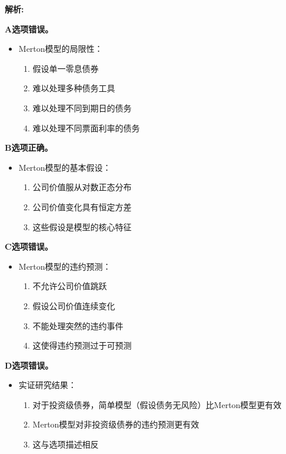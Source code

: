 \documentclass{article}
\newenvironment{explanation}
{\textbf{解析:}\par}
{\par}
\begin{document}
\begin{explanation}
    \textbf{A选项错误。}
    \begin{itemize}
        \item Merton模型的局限性：
        \begin{enumerate}
            \item 假设单一零息债券
            \item 难以处理多种债务工具
            \item 难以处理不同到期日的债务
            \item 难以处理不同票面利率的债务
        \end{enumerate}
    \end{itemize}
    
    \textbf{B选项正确。}
    \begin{itemize}
        \item Merton模型的基本假设：
        \begin{enumerate}
            \item 公司价值服从对数正态分布
            \item 公司价值变化具有恒定方差
            \item 这些假设是模型的核心特征
        \end{enumerate}
    \end{itemize}
    
    \textbf{C选项错误。}
    \begin{itemize}
        \item Merton模型的违约预测：
        \begin{enumerate}
            \item 不允许公司价值跳跃
            \item 假设公司价值连续变化
            \item 不能处理突然的违约事件
            \item 这使得违约预测过于可预测
        \end{enumerate}
    \end{itemize}
    
    \textbf{D选项错误。}
    \begin{itemize}
        \item 实证研究结果：
        \begin{enumerate}
            \item 对于投资级债券，简单模型（假设债务无风险）比Merton模型更有效
            \item Merton模型对非投资级债券的违约预测更有效
            \item 这与选项描述相反
        \end{enumerate}
    \end{itemize}
\end{explanation}
\end{document}
